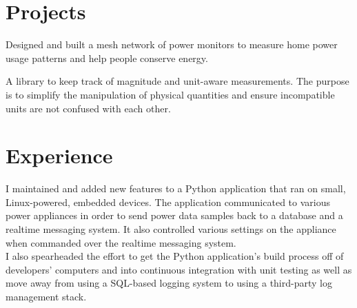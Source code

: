 \documentclass[letterpaper]{deedy-resume} %
\begin{document}
\hfill
%
%
\begin{minipage}[t]{0.66\textwidth} %


\section{Projects}


Designed and built a mesh network of power monitors to measure home power usage patterns and help people conserve energy.


\sectionspace %

A library to keep track of magnitude and unit-aware measurements.
The purpose is to simplify the manipulation of physical quantities and ensure incompatible units are not confused with each other.

\sectionspace %


\section{Experience}


I maintained and added new features to a Python application that ran on small, Linux-powered, embedded devices.
The application communicated to various power appliances in order to send power data samples back to a database and a realtime messaging system.
It also controlled various settings on the appliance when commanded over the realtime messaging system.\\
I also spearheaded the effort to get the Python application's build process off of developers' computers and into continuous integration with unit testing
as well as move away from using a SQL-based logging system to using a third-party log management stack.
\sectionspace


\end{minipage}
\end{document}
